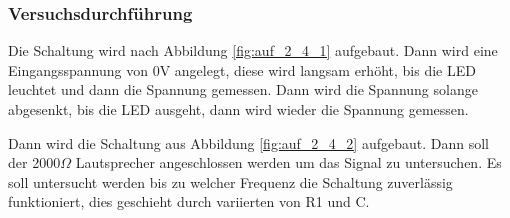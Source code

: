 \documentclass[12pt,a4paper]{article}
\begin{document}
\subsubsection*{Versuchsdurchführung}

Die Schaltung wird nach Abbildung \ref{fig:auf_2_4_1} aufgebaut. Dann wird eine Eingangsspannung von 0V angelegt, diese wird langsam erhöht, bis die LED leuchtet und dann die Spannung gemessen. Dann wird die Spannung solange abgesenkt, bis die LED ausgeht, dann wird wieder die Spannung gemessen.

Dann wird die Schaltung aus Abbildung \ref{fig:auf_2_4_2} aufgebaut. Dann soll der 2000$\Omega$ Lautsprecher angeschlossen werden um das Signal zu untersuchen. Es soll untersucht werden bis zu welcher Frequenz die Schaltung zuverlässig funktioniert, dies geschieht durch variierten von R1 und C.
\end{document}
